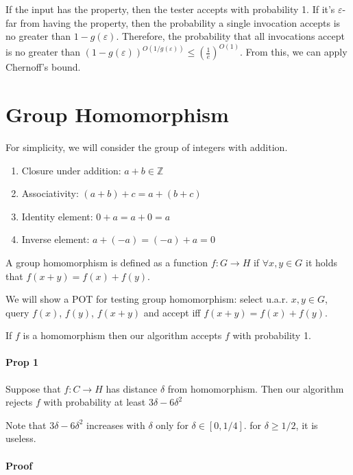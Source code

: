 \documentclass{idc_msc}
\begin{document}
If the input has the property, then the tester accepts with probability 1.
If it's \(\varepsilon\)-far from having the property, then the probability a single invocation accepts is no greater than \(1 - g(\varepsilon)\).
Therefore, the probability that all invocations accept is no greater than \((1 - g(\varepsilon))^{O(1/ g(\varepsilon))} \le \left(\frac{1}{e}\right)^{O(1)}\).
From this, we can apply Chernoff's bound.

\section{Group Homomorphism}

For simplicity, we will consider the group of integers with addition.

\begin{enumerate}
  \item Closure under addition: \(a + b \in \mathbb{Z}\)
  \item Associativity: \((a + b) + c = a + (b + c)\)
  \item Identity element: \(0 + a = a + 0 = a\)
  \item Inverse element: \(a + (-a) = (-a) + a = 0\)
\end{enumerate}

A group homomorphism is defined as a function \(f : G \to H\) if \(\forall x, y \in G\) it holds that \(f(x + y) = f(x) + f(y)\).

We will show a POT for testing group homomorphism:
select u.a.r. \(x,y \in G\), query \(f(x)\), \(f(y)\), \(f(x+y)\) and accept iff \(f(x+y) = f(x) + f(y)\).

If \(f\) is a homomorphism then our algorithm accepts \(f\) with probability 1.

\paragraph{Prop 1}

Suppose that \(f : C \to H\) has distance \(\delta\) from homomorphism. Then our algorithm rejects \(f\) with probability at least \(3 \delta - 6 \delta^2\)

Note that \(3 \delta - 6 \delta^2\) increases with \(\delta\) only for \(\delta \in [0, 1/4]\). for \(\delta \ge 1/2\), it is useless.

\paragraph{Proof}
\end{document}
